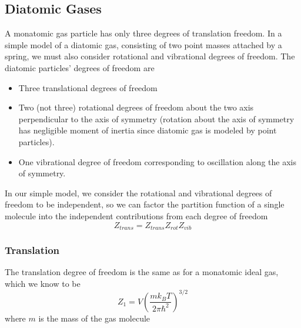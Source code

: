 \documentclass[11pt, a4paper]{article}
\begin{document}
\subsection{Diatomic Gases}
A monatomic gas particle has only three degrees of translation freedom. In a simple model of a diatomic gas, consisting of two point masses attached by a spring, we must also consider rotational and vibrational degrees of freedom. The diatomic particles' degrees of freedom are
\begin{itemize}
	\item Three translational degrees of freedom
	\item Two (not three) rotational degrees of freedom about the two axis perpendicular to the axis of symmetry (rotation about the axis of symmetry has negligible moment of inertia since diatomic gas is modeled by point particles).
	\item One vibrational degree of freedom corresponding to oscillation along the axis of symmetry.
\end{itemize}
In our simple model, we consider the rotational and vibrational degrees of freedom to be independent, so we can factor the partition function of a single molecule into the independent contributions from each degree of freedom
\begin{equation*}
	Z_{trans} = Z_{trans}Z_{rot}Z_{vib}
\end{equation*}

\subsubsection{Translation}
The translation degree of freedom is the same as for a monatomic ideal gas, which we know to be
\begin{equation*}
	Z_{1} = V \left(\frac{mk_{B}T}{2\pi \hbar^{2}}\right)^{3/2}
\end{equation*}
where $ m $ is the mass of the gas molecule
\end{document}
